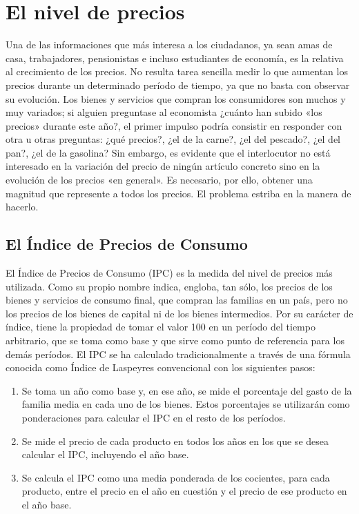 \documentclass[
]{krantz}
\providecommand{\tightlist}{%
  \setlength{\itemsep}{0pt}\setlength{\parskip}{0pt}}
\begin{document}
\hypertarget{el-nivel-de-precios}{%
\section{El nivel de precios}\label{el-nivel-de-precios}}

Una de las informaciones que más interesa a los ciudadanos, ya sean amas de casa, trabajadores, pensionistas e incluso estudiantes de economía, es la relativa al crecimiento de los precios. No resulta tarea sencilla medir lo que aumentan los precios durante un determinado período de tiempo, ya que no basta con observar su evolución. Los bienes y servicios que compran los consumidores son muchos y muy variados; si alguien preguntase al economista ¿cuánto han subido «los precios» durante este año?, el primer impulso podría consistir en responder con otra u otras preguntas: ¿qué precios?, ¿el de la carne?, ¿el del pescado?, ¿el del pan?, ¿el de la gasolina? Sin embargo, es evidente que el interlocutor no está interesado en la variación del precio de ningún artículo concreto sino en la evolución de los precios «en general». Es necesario, por ello, obtener una magnitud que represente a todos los precios. El problema estriba en la manera de hacerlo.

\hypertarget{el-uxedndice-de-precios-de-consumo}{%
\subsection{El Índice de Precios de Consumo}\label{el-uxedndice-de-precios-de-consumo}}

El Índice de Precios de Consumo (IPC) es la medida del nivel de precios más utilizada. Como su propio nombre indica, engloba, tan sólo, los precios de los bienes y servicios de consumo final, que compran las familias en un país, pero no los precios de los bienes de capital ni de los bienes intermedios. Por su carácter de índice, tiene la propiedad de tomar el valor 100 en un período del tiempo arbitrario, que se toma como base y que sirve como punto de referencia para los demás períodos. El IPC se ha calculado tradicionalmente a través de una fórmula conocida como Índice de Laspeyres convencional con los siguientes pasos:

\begin{enumerate}
\def\labelenumi{\arabic{enumi}.}
\tightlist
\item
  Se toma un año como base y, en ese año, se mide el porcentaje del gasto de la familia media en cada uno de los bienes. Estos porcentajes se utilizarán como ponderaciones para calcular el IPC en el resto de los períodos.
\item
  Se mide el precio de cada producto en todos los años en los que se desea calcular el IPC, incluyendo el año base.
\item
  Se calcula el IPC como una media ponderada de los cocientes, para cada producto, entre el precio en el año en cuestión y el precio de ese producto en el año base.
\end{enumerate}
\end{document}
